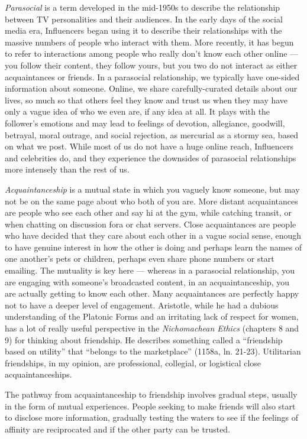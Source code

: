 \documentclass[
]{book}
\begin{document}
\emph{Parasocial} is a term developed in the mid-1950s to describe the relationship between TV personalities and their audiences. In the early days of the social media era, Influencers began using it to describe their relationships with the massive numbers of people who interact with them. More recently, it has begun to refer to interactions among people who really don't know each other online --- you follow their content, they follow yours, but you two do not interact as either acquaintances or friends. In a parasocial relationship, we typically have one-sided information about someone. Online, we share carefully-curated details about our lives, so much so that others feel they know and trust us when they may have only a vague idea of who we even are, if any idea at all. It plays with the follower's emotions and may lead to feelings of devotion, allegiance, goodwill, betrayal, moral outrage, and social rejection, as mercurial as a stormy sea, based on what we post. While most of us do not have a huge online reach, Influencers and celebrities do, and they experience the downsides of parasocial relationships more intensely than the rest of us.

\emph{Acquaintanceship} is a mutual state in which you vaguely know someone, but may not be on the same page about who both of you are. More distant acquaintances are people who see each other and say hi at the gym, while catching transit, or when chatting on discussion fora or chat servers. Close acquaintances are people who have decided that they care about each other in a vague social sense, enough to have genuine interest in how the other is doing and perhaps learn the names of one another's pets or children, perhaps even share phone numbers or start emailing. The mutuality is key here --- whereas in a parasocial relationship, you are engaging with someone's broadcasted content, in an acquaintanceship, you are actually getting to know each other. Many acquaintances are perfectly happy not to have a deeper level of engagement. Aristotle, while he had a dubious understanding of the Platonic Forms and an irritating lack of respect for women, has a lot of really useful perspective in the \emph{Nichomachean Ethics} (chapters 8 and 9) for thinking about friendship. He describes something called a ``friendship based on utility'' that ``belongs to the marketplace'' (1158a, ln. 21-23). Utilitarian friendships, in my opinion, are professional, collegial, or logistical close acquaintanceships.

The pathway from acquaintanceship to friendship involves gradual steps, usually in the form of mutual experiences. People seeking to make friends will also start to disclose more information, gradually testing the waters to see if the feelings of affinity are reciprocated and if the other party can be trusted.
\end{document}
